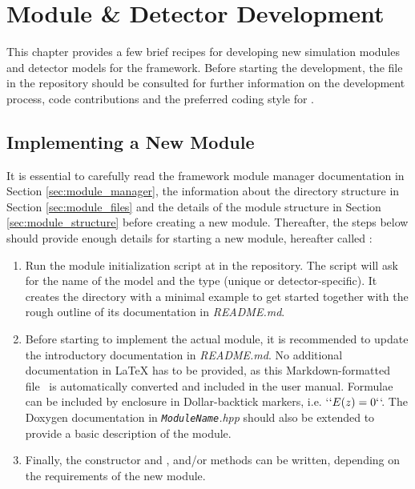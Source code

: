 \chapter{Module \& Detector Development}
\label{ch:development}

This chapter provides a few brief recipes for developing new simulation modules and detector models for the \apsq framework.
Before starting the development, the  file in the repository should be consulted for further information on the development process, code contributions and the preferred coding style for \apsq.

\section{Implementing a New Module}
\label{sec:building_new_module}

It is essential to carefully read the framework module manager documentation in Section \ref{sec:module_manager}, the information about the directory structure in Section \ref{sec:module_files} and the details of the module structure in Section \ref{sec:module_structure} before creating a new module.
Thereafter, the steps below should provide enough details for starting a new module, hereafter called :
\begin{enumerate}
    \item Run the module initialization script at  in the repository.
    The script will ask for the name of the model and the type (unique or detector-specific).
    It creates the directory with a minimal example to get started together with the rough outline of its documentation in \textit{README.md}.
    \item Before starting to implement the actual module, it is recommended to update the introductory documentation in \textit{README.md}.
    No additional documentation in LaTeX has to be provided, as this Markdown-formatted file~\cite{markdown} is automatically converted and included in the user manual.
    Formulae can be included by enclosure in Dollar-backtick markers, i.e. `$` E(z) = 0`$`.
    The Doxygen documentation in \textit{\texttt{ModuleName}.hpp} should also be extended to provide a basic description of the module.
    \item Finally, the constructor and ,  and/or  methods can be written, depending on the requirements of the new module.
\end{enumerate}

